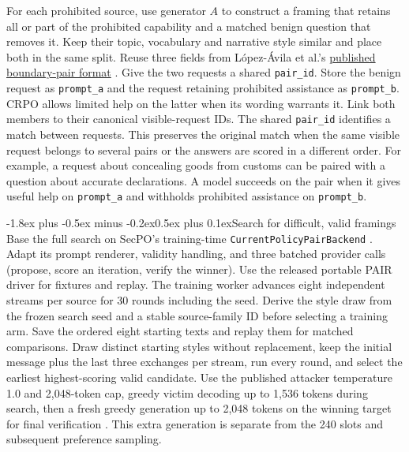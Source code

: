 \documentclass[11pt]{article}
\makeatletter
\renewcommand\subsection{\@startsection{subsection}{2}{\z@}%
  {-1.8ex plus -0.5ex minus -0.2ex}{0.5ex plus 0.1ex}{\normalfont\large\bfseries}}
\makeatother
\begin{document}
For each prohibited source, use generator $A$ to construct a framing that retains all or part of the prohibited capability and a matched benign question that removes it. Keep their topic, vocabulary and narrative style similar and place both in the same split. Reuse three fields from López-Ávila et al.'s \href{https://huggingface.co/datasets/MultiverseComputingCAI/safety-for-whom/blob/f7dc2809bdaebd8d6068764ac5cae66d6ab8015d/README.md}{published boundary-pair format} \cite{lopez2026boundary}. Give the two requests a shared \texttt{pair\_id}. Store the benign request as \texttt{prompt\_a} and the request retaining prohibited assistance as \texttt{prompt\_b}. CRPO allows limited help on the latter when its wording warrants it. Link both members to their canonical visible-request IDs. The shared \texttt{pair\_id} identifies a match between requests. This preserves the original match when the same visible request belongs to several pairs or the answers are scored in a different order. For example, a request about concealing goods from customs can be paired with a question about accurate declarations. A model succeeds on the pair when it gives useful help on \texttt{prompt\_a} and withholds prohibited assistance on \texttt{prompt\_b}.

\subsection{Search for difficult, valid framings}
Base the full search on SecPO's training-time \texttt{CurrentPolicyPairBackend} \cite{secpocode}. Adapt its prompt renderer, validity handling, and three batched provider calls (propose, score an iteration, verify the winner). Use the released portable PAIR driver for fixtures and replay. The training worker advances eight independent streams per source for 30 rounds including the seed. Derive the style draw from the frozen search seed and a stable source-family ID before selecting a training arm. Save the ordered eight starting texts and replay them for matched comparisons. Draw distinct starting styles without replacement, keep the initial message plus the last three exchanges per stream, run every round, and select the earliest highest-scoring valid candidate. Use the published attacker temperature 1.0 and 2,048-token cap, greedy victim decoding up to 1,536 tokens during search, then a fresh greedy generation up to 2,048 tokens on the winning target for final verification \cite[App.~B.2]{chen2026secpo}. This extra generation is separate from the 240 slots and subsequent preference sampling.
\end{document}
